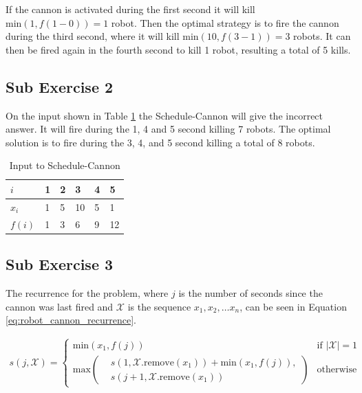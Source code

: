 \documentclass[koma,a4paper]{article}
\begin{document}
If the cannon is activated during the first second it will kill $\text{min}(1, f(1 - 0)) = 1$ robot. Then the optimal strategy is to fire the cannon during the third second, where it will kill $\text{min}(10, f(3 - 1)) = 3$ robots. It can then be fired again in the fourth second to kill 1 robot, resulting a total of 5 kills.

\subsection{Sub Exercise 2}
On the input shown in Table \ref{tab:shed_cannon_bad_input} the Schedule-Cannon will give the incorrect answer. It will fire during the 1, 4 and 5 second killing 7 robots. The optimal solution is to fire during the 3, 4, and 5 second killing a total of 8 robots.

\begin{table}[htp]%
  \centering
  \begin{tabular}{llllll}
    \toprule
    $i$ & \textbf{1} & \textbf{2} & \textbf{3} & \textbf{4} & \textbf{5} \\
    \midrule
    $x_i$  & 1 & 5 & 10 & 5 & 1 \\
    $f(i)$ & 1 & 3 & 6 & 9 & 12 \\
    \bottomrule
  \end{tabular}
\caption{Input to Schedule-Cannon}
\label{tab:shed_cannon_bad_input}
\end{table}

\subsection{Sub Exercise 3}
The recurrence for the problem, where $j$ is the number of seconds since the cannon was last fired and $\mathcal{X}$ is the sequence $x_1, x_2, \dots x_n$, can be seen in Equation \ref{eq:robot_cannon_recurrence}.

\begin{align}
  s(j, \mathcal{X}) = \begin{cases}
    \text{min}(x_1, f(j)) &\text{if } |\mathcal{X}| = 1 \\
    \text{max}\left(\begin{aligned}
      &s(1, \mathcal{X}.\text{remove}(x_1)) + \text{min}(x_1, f(j)),\\
      &s(j + 1, \mathcal{X}.\text{remove}(x_1))
    \end{aligned}\right) &\text{otherwise}
  \end{cases}
  \label{eq:robot_cannon_recurrence}
\end{align}
\end{document}

